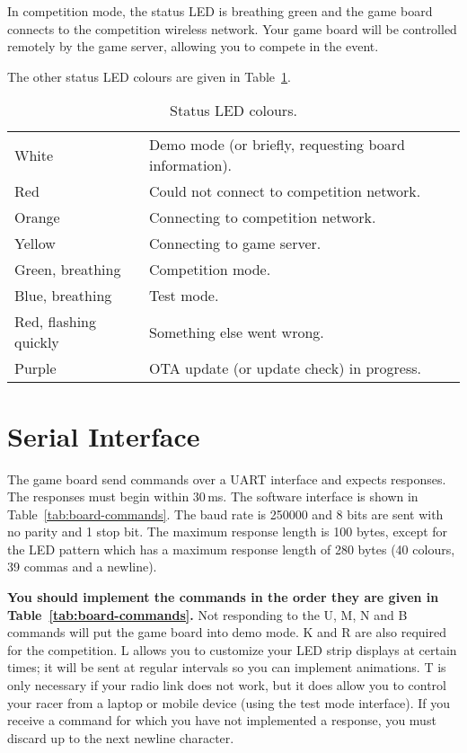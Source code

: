 \documentclass[11pt, a4paper]{article}
\begin{document}
In competition mode, the status LED is breathing green and the game board connects to the competition wireless network.
Your game board will be controlled remotely by the game server, allowing you to compete in the event.

The other status LED colours are given in Table~\ref{tab:status-led}.

\begin{table}[H]
  \centering
  \begin{tabular}{l l}
    White  & Demo mode (or briefly, requesting board information).  \\
    Red    & Could not connect to competition network.  \\
    Orange & Connecting to competition network.  \\
    Yellow & Connecting to game server.  \\
    Green, breathing & Competition mode.  \\
    Blue, breathing & Test mode.  \\
    Red, flashing quickly & Something else went wrong.  \\
    Purple & OTA update (or update check) in progress.
  \end{tabular}
  \caption{Status LED colours.}
  \label{tab:status-led}
\end{table}


\section{Serial Interface}
The game board send commands over a UART interface and expects responses.
The responses must begin within 30\,ms.
The software interface is shown in Table~\ref{tab:board-commands}.
The baud rate is 250000 and 8 bits are sent with no parity and 1 stop bit.
The maximum response length is 100 bytes, except for the LED pattern which has a maximum response length of 280 bytes (40 colours, 39 commas and a newline).

\textbf{You should implement the commands in the order they are given in Table~\ref{tab:board-commands}.}
Not responding to the U, M, N and B commands will put the game board into demo mode.
K and R are also required for the competition.
L allows you to customize your LED strip displays at certain times; it will be sent at regular intervals so you can implement animations.
T is only necessary if your radio link does not work, but it does allow you to control your racer from a laptop or mobile device (using the test mode interface).
If you receive a command for which you have not implemented a response, you must discard up to the next newline character.
\end{document}
